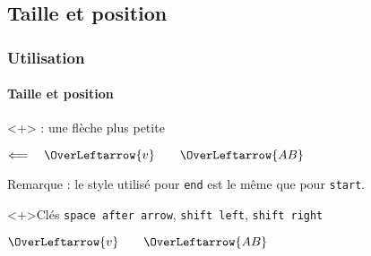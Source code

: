 \documentclass[10pt, aspectratio=3218]{beamer}
\newcommand*{\key}[1]{\textcolor{Option}{\texttt{\small #1}}}
\newcommand{\rmq}[1]{{\small #1}}
\begin{document}
\subsection{Taille et position}

\begin{frame}[fragile]

\frametitle{Utilisation}
\framesubtitle{Taille et position}

\begin{block}<+>{ : une flèche plus petite}
\undef\OverLeftarrow%
  \begin{dispExample}
$ \Leftarrow\joinrel\Relbar \quad \OverLeftarrow{v} \qquad \OverLeftarrow{AB} $
 \end{dispExample}

 \rmq{\alert{Remarque :} le style utilisé pour \key{end} est le même que pour
   \key{start}}.
\end{block}

\begin{block}<+>{Clés \key{space after arrow}, \key{shift left}, \key{shift right}}
\undef\OverLeftarrow%
  \begin{dispExample}
$ \OverLeftarrow{v} \qquad \OverLeftarrow{AB} $
 \end{dispExample}
\end{block}

\end{frame}
\end{document}

